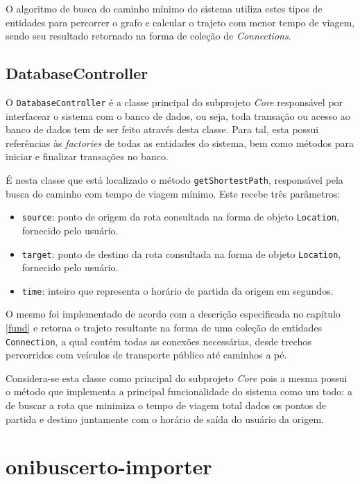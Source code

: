 O algoritmo de busca do caminho mínimo do sistema utiliza estes tipos de entidades para percorrer o grafo e calcular o trajeto com menor tempo de viagem, sendo seu resultado retornado na forma de coleção de \emph{Connections}.

\subsection{DatabaseController}
O \texttt{DatabaseController} é a classe principal do subprojeto \emph{Core} responsável por interfacear o sistema com o banco de dados, ou seja, toda transação ou acesso ao banco de dados tem de ser feito através desta classe.
Para tal, esta possui referências às \emph{factories} de todas as entidades do sistema, bem como métodos para iniciar e finalizar transações no banco.

É nesta classe que está localizado o método \texttt{getShortestPath}, responsável pela busca do caminho com tempo de viagem mínimo. 
Este recebe três parâmetros:

\begin{itemize}
	\item \texttt{source}: ponto de origem da rota consultada na forma de objeto \texttt{Location}, fornecido pelo usuário.
	\item \texttt{target}: ponto de destino da rota consultada na forma de objeto \texttt{Location}, fornecido pelo usuário.
	\item \texttt{time}: inteiro que representa o horário de partida da origem em segundos.
\end{itemize}

O mesmo foi implementado de acordo com a descrição especificada no capítulo \ref{fund} e retorna o trajeto resultante na forma de uma coleção de entidades \texttt{Connection}, a qual contém todas as conexões necessárias, desde trechos percorridos com veículos de transporte público até caminhos a pé.

Considera-se esta classe como principal do subprojeto \emph{Core} pois a mesma possui o método que implementa a principal funcionalidade do sistema como um todo: a de buscar a rota que minimiza o tempo de viagem total dados os pontos de partida e destino juntamente com o horário de saída do usuário da origem.

\section{onibuscerto-importer}

